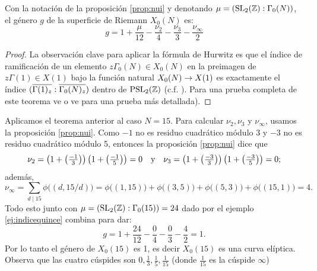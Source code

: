 \documentclass[../../tesis_maestria]{subfiles}
\begin{document}
\begin{thm}\label{thm:genus_curva_modular}
  Con la notaci\'on de la proposici\'on \ref{prop:nui} y denotando $\mu=(\mathrm{SL}_2(\mathbb{Z}):\Gamma_0(N))$,
  el g\'enero $g$ de la superficie de Riemann $X_0(N)$ es:
  \[
    g=1+\frac{\mu}{12}-\frac{\nu_2}{4}-\frac{\nu_3}{3}-\frac{\nu_{\infty}}{2}
  \]
\end{thm}
\begin{proof}
  La observaci\'on clave para aplicar la f\'ormula de Hurwitz es que el \'indice de ramificaci\'on
  de un elemento $z\Gamma_0(N)\in X_0(N)$ en la preimagen de $z\Gamma(1)\in X(1)$ bajo la funci\'on
  natural $X_0(N)\rightarrow X(1)$ es exactamente el \'indice $(\overline{\Gamma(1)_z}:\overline{\Gamma_0(N)_z})$ dentro
  de $\mathrm{PSL}_2(\mathbb{Z})$ (c.f. \cite[\S1.5, proposici\'on 1.37]{ShimuraITTATOAF}). Para una prueba
  completa de este teorema ve \cite[\S1.6, proposici\'on 1.40]{ShimuraITTATOAF} o ve
  \cite[Teorema 3.1.1]{DiamondShurmanAFCIMF} para una prueba m\'as detallada).
\end{proof}

\begin{ejemplo}\label{ej:Gamma15}
  Aplicamos el teorema anterior al caso $N=15$. Para calcular $\nu_2,\nu_3$ y $\nu_{\infty}$,
  usamos la proposici\'on \ref{prop:nui}. Como $-1$ no es residuo cuadr\'atico m\'odulo 3 y
  $-3$ no es residuo cuadr\'atico m\'odulo 5, entonces la proposici\'on \ref{prop:nui} dice que
  \[
    \nu_2=\left( 1+\left( \tfrac{-1}{3} \right) \right)\left( 1+\left( \tfrac{-1}{5} \right) \right)=0 \quad\text{y}\quad
    \nu_3=\left( 1+\left( \tfrac{-3}{3} \right) \right)\left( 1+\left( \tfrac{-3}{5} \right) \right)=0;
  \]
  adem\'as,
  \[
    \nu_{\infty}=\sum_{d\mid15}\phi\big((d,15/d)\big)=
    \phi\big((1,15)\big)+\phi\big((3,5)\big)+\phi\big((5,3)\big)+\phi\big((15,1)\big)=4.
  \]
  Todo esto junto con $\mu=(\mathrm{SL}_2(\mathbb{Z}):\Gamma_0(15))=24$ dado por el ejemplo \ref{ej:indicequince}
  combina para dar:
  \[
    g=1+\frac{24}{12}-\frac{0}{4}-\frac{0}{3}-\frac{4}{2}=1.
  \]
  Por lo tanto el g\'enero de $X_0(15)$ es 1, es decir $X_0(15)$ es una curva el\'iptica. Observa que las cuatro cúspides son $0,\tfrac{1}{3},\tfrac{1}{5},\tfrac{1}{15}$ (donde $\tfrac{1}{15}$
  es la c\'uspide $\infty$)
\end{ejemplo}
\end{document}
